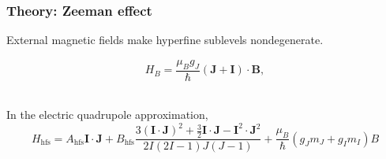 \documentclass{beamer}
\theoremstyle{definition}
\newcommand{\f}[2]{\frac{#1}{#2}}
\newcommand{\Gj}[6]{ \begin{Bmatrix}
		#1 & #2 & #3 \\
		#4 & #5 & #6 
\end{Bmatrix}}
\begin{document}
\begin{frame}
\end{frame}














%
%
%
%
%
%
%
%
%
%
%
%
%
%



\begin{frame}
\frametitle{Theory: Zeeman effect}


External magnetic fields make hyperfine sublevels nondegenerate.

\begin{equation*}
H_B= \f{\mu_B g_J}{\hbar} ( \mathbf{J} +  \mathbf{I})\cdot \mathbf{B},
\end{equation*}



$\,$\\


In the electric quadrupole approximation,
\begin{equation*}
H_\text{hfs} = A_{\text{hfs}}\mathbf{I}\cdot \mathbf{J} + B_\text{hfs} \f{3(\mathbf{I}\cdot \mathbf{J})^2 + \f{3}{2}\mathbf{I}\cdot \mathbf{J} - \mathbf{I}^2\cdot \mathbf{J}^2}{2I(2I-1)J(J-1)} + \f{\mu_B}{\hbar}(g_Jm_J + g_Im_I)B
\end{equation*}	

\end{frame}
\end{document}
